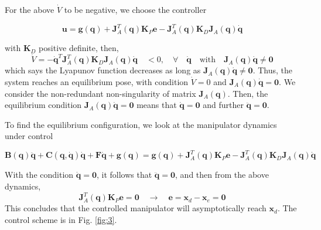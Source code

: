 \documentclass[10pt]{article}
\begin{document}
For the above $\dot{V}$ to be negative, we choose the controller
\begin{shaded}
\begin{equation}
        \boldsymbol{u}=\boldsymbol{g}(\boldsymbol{q})+\boldsymbol{J}_{A}^{T}(\boldsymbol{q}) \boldsymbol{K}_{P} {\boldsymbol{e}}-\boldsymbol{J}_{A}^{T}(\boldsymbol{q}) \boldsymbol{K}_{D} \boldsymbol{J}_{A}(\boldsymbol{q}) \dot{\boldsymbol{q}}
\end{equation}
\end{shaded}
with $\boldsymbol{K}_{D}$ positive definite, then,
$$
\dot{V}=-\dot{\boldsymbol{q}}^{T} \boldsymbol{J}_{A}^{T}(\boldsymbol{q}) \boldsymbol{K}_{D} \boldsymbol{J}_{A}(\boldsymbol{q}) \dot{\boldsymbol{q}} \quad <0,  \quad \forall \quad\boldsymbol{\dot{q}}\quad\text{with} \quad \boldsymbol{J}_A(\boldsymbol{q})\dot{\boldsymbol{q}} \neq \mathbf{0}
$$
which says  the Lyapunov function decreases as long as $\boldsymbol{J}_A(\boldsymbol{q})\dot{\boldsymbol{q}} \neq \mathbf{0}$. Thus, the system reaches an   equilibrium pose, with condition $\dot{V}= 0$ and $\boldsymbol{J}_A(\boldsymbol{q})\dot{\boldsymbol{q}}=\mathbf{0}$. We consider the non-redundant non-singularity of matrix $\boldsymbol{J}_A(\boldsymbol{q})$. Then, the equilibrium condition $\boldsymbol{J}_A(\boldsymbol{q})\dot{\boldsymbol{q}}=\mathbf{0}$ means that $\dot{\boldsymbol{q}}=\mathbf{0}$ and further $\ddot{\boldsymbol{q}} =\mathbf{0}$.



To find the equilibrium configuration, we look at the manipulator dynamics under control

$$
\boldsymbol{B}(\boldsymbol{q}) \ddot{\boldsymbol{q}}+\boldsymbol{C}(\boldsymbol{q}, \dot{\boldsymbol{q}}) \dot{\boldsymbol{q}}+\boldsymbol{F} \dot{\boldsymbol{q}}+\boldsymbol{g}(\boldsymbol{q})=\boldsymbol{g}(\boldsymbol{q})+\boldsymbol{J}_{A}^{T}(\boldsymbol{q}) \boldsymbol{K}_{P} {\boldsymbol{e}}-\boldsymbol{J}_{A}^{T}(\boldsymbol{q}) \boldsymbol{K}_{D} \boldsymbol{J}_{A}(\boldsymbol{q}) \dot{\boldsymbol{q}}
$$

With the condition  $\dot{\boldsymbol{q}}=\mathbf{0}$, it follows that   $\ddot{\boldsymbol{q}} =\mathbf{0}$, and then from the above dynamics, 
$$
\boldsymbol{J}_{A}^{T}(\boldsymbol{q}) \boldsymbol{K}_{P} {\boldsymbol{e}}=\mathbf{0}\quad \rightarrow\quad {\boldsymbol{e}}=\boldsymbol{x}_{d}-\boldsymbol{x}_{e}=\mathbf{0}
$$
This concludes that the controlled manipulator will asymptotically reach $\boldsymbol{x}_d$.
The  control scheme is  in  Fig.  \ref{fig:3}. 
\end{document}
